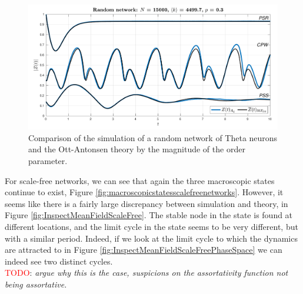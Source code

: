 \begin{figure}[H]
\centering
\includegraphics[width = \textwidth]{../Figures/InspectMeanFieldRandom.pdf}
\caption{Comparison of the simulation of a random network of Theta neurons and the Ott-Antonsen theory by the magnitude of the order parameter. }
\label{fig:InspectMeanFieldRandom}
\end{figure}

For scale-free networks, we can see that again the three macroscopic states continue to exist, Figure \ref{fig:macroscopicstatesscalefreenetworks}. However, it seems like there is a fairly large discrepancy between simulation and theory, in Figure \ref{fig:InspectMeanFieldScaleFree}. The stable node in the \PSR state is found at different locations, and the limit cycle in the \CPW state seems to be very different, but with a similar period. Indeed, if we look at the limit cycle to which the dynamics are attracted to in Figure \ref{fig:InspectMeanFieldScaleFreePhaseSpace} we can indeed see two distinct cycles. \\

\textcolor{red}{TODO}: \textsl{argue why this is the case, suspicions on the assortativity function not being assortative.}


